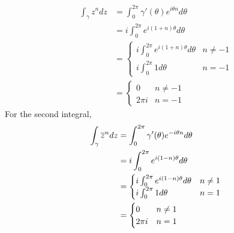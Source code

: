 \documentclass{homework}
\begin{document}
                      \begin{solution}
                      \begin{align*}
                      \int_\gamma z^ndz &= \int_{0}^{2\pi} \gamma'(\theta) e^{i\theta n} d\theta\\
                      &= i\int_{0}^{2\pi}e^{i(1+n)\theta} d\theta\\
                      &= \begin{cases}i\int_{0}^{2\pi} e^{i(1+n)\theta} d\theta & n \neq -1\\
                      i\int_{0}^{2\pi} 1 d\theta & n = -1 \end{cases}\\
                      &= \begin{cases} 0 & n \neq -1\\
                      2\pi i & n = -1 \end{cases}
                      \end{align*}
                      For the second integral,
                      \begin{align*}
                      \int_\gamma \overline{z}^ndz &= \int_{0}^{2\pi} \gamma'(\theta) e^{-i\theta n} d\theta\\
                      &= i\int_{0}^{2\pi}e^{i(1-n)\theta} d\theta\\
                      &= \begin{cases}i\int_{0}^{2\pi} e^{i(1-n)\theta} d\theta & n \neq 1\\
                      i\int_{0}^{2\pi} 1 d\theta & n = 1 \end{cases}\\
                      &= \begin{cases} 0 & n \neq 1\\
                      2\pi i & n = 1 \end{cases}
                      \end{align*}
                      \end{solution}
\end{document}
